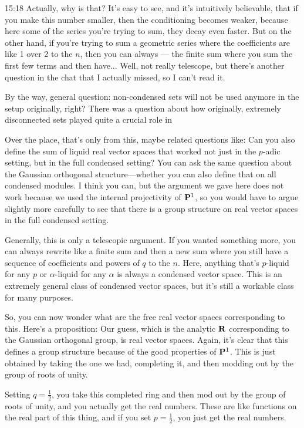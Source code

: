 \begin{unfinished}{15:18}
Actually, why is that? It's easy to see, and it's intuitively believable, that if you make this number smaller, then the conditioning becomes weaker, because here some of the series you're trying to sum, they decay even faster. But on the other hand, if you're trying to sum a geometric series where the coefficients are like 1 over 2 to the $n$, then you can always --- the finite sum where you sum the first few terms and then have... Well, not really telescope, but there's another question in the chat that I actually missed, so I can't read it.

By the way, general question: non-condensed sets will not be used anymore in the setup originally, right? There was a question about how originally, extremely disconnected sets played quite a crucial role in

Over the place, that's only from this, maybe related questions like: Can you also define the sum of liquid real vector spaces that worked not just in the $p$-adic setting, but in the full condensed setting? You can ask the same question about the Gaussian orthogonal structure---whether you can also define that on all condensed modules. I think you can, but the argument we gave here does not work because we used the internal projectivity of $\P^1$, so you would have to argue slightly more carefully to see that there is a group structure on real vector spaces in the full condensed setting.

Generally, this is only a telescopic argument. If you wanted something more, you can always rewrite like a finite sum and then a new sum where you still have a sequence of coefficients and powers of $q$ to the $n$. Here, anything that's $p$-liquid for any $p$ or $\alpha$-liquid for any $\alpha$ is always a condensed vector space. This is an extremely general class of condensed vector spaces, but it's still a workable class for many purposes.

So, you can now wonder what are the free real vector spaces corresponding to this. Here's a proposition: Our guess, which is the analytic $\R$ corresponding to the Gaussian orthogonal group, is real vector spaces. Again, it's clear that this defines a group structure because of the good properties of $\P^1$. This is just obtained by taking the one we had, completing it, and then modding out by the group of roots of unity.

Setting $q = \frac{1}{2}$, you take this completed ring and then mod out by the group of roots of unity, and you actually get the real numbers. These are like functions on the real part of this thing, and if you set $p = \frac{1}{2}$, you just get the real numbers.


\end{unfinished}
